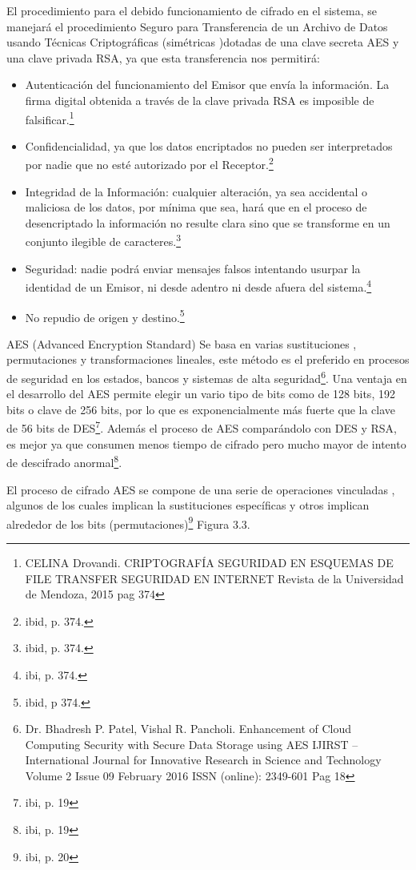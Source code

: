 \documentclass[a4paper,openright,12pt]{book}
\theoremstyle{definition}
\theoremstyle{remark}
\begin{document}
El procedimiento para el debido funcionamiento de cifrado en el sistema, se manejará el procedimiento Seguro para Transferencia de un Archivo de Datos usando Técnicas Criptográficas (simétricas )dotadas de una clave secreta AES y una clave privada RSA, ya que esta transferencia nos permitirá:

\begin{itemize}
\item Autenticación del funcionamiento del Emisor que envía la información. La firma digital obtenida a través de la clave privada RSA es imposible de falsificar.\footnote{CELINA Drovandi. CRIPTOGRAFÍA
SEGURIDAD EN ESQUEMAS DE FILE TRANSFER SEGURIDAD EN INTERNET Revista de la Universidad de Mendoza, 2015 pag 374}
\item Confidencialidad, ya que los datos encriptados no pueden ser interpretados por nadie que no esté autorizado por el Receptor.\footnote{ibid, p. 374.}
\item Integridad de la Información: cualquier alteración, ya sea accidental o maliciosa de los datos, por mínima que sea, hará que en el proceso de desencriptado la información no resulte clara sino que se transforme en un conjunto ilegible de caracteres.\footnote{ibid, p. 374.}
\item Seguridad: nadie podrá enviar mensajes falsos intentando usurpar la identidad de un Emisor, ni desde adentro ni desde afuera del sistema.\footnote{ibi, p. 374.}
\item No repudio de origen y destino.\footnote{ibid, p 374.}
\end{itemize}

AES (Advanced Encryption Standard) Se basa en varias sustituciones , permutaciones y transformaciones lineales, este método es el preferido en procesos de seguridad en los estados, bancos y sistemas de alta seguridad\footnote{Dr. Bhadresh P. Patel, Vishal R. Pancholi. Enhancement of Cloud Computing Security with Secure Data Storage using AES IJIRST –International Journal for Innovative Research in Science and Technology Volume 2 Issue 09 February 2016 ISSN (online): 2349-601 Pag 18}. Una ventaja en el desarrollo del AES permite elegir un vario tipo de bits como de 128 bits, 192 bits o clave de 256 bits, por lo que es exponencialmente más fuerte que la clave de 56 bits de DES\footnote{ibi, p. 19}. Además el proceso de AES comparándolo con DES y RSA, es mejor ya que consumen menos tiempo de cifrado pero mucho mayor de intento de descifrado anormal\footnote{ibi, p. 19}.  

El proceso de cifrado AES se compone de una serie de operaciones vinculadas , algunos de los cuales implican la sustituciones específicas y otros implican alrededor de los bits (permutaciones)\footnote{ibi, p.  20} Figura 3.3. 
\end{document}
